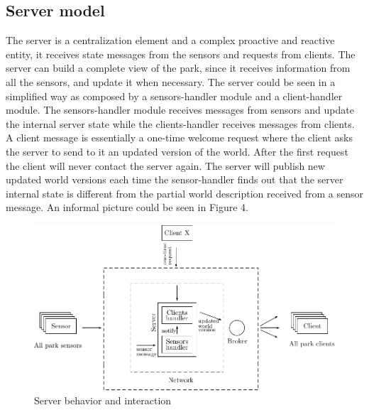 \documentclass[11pt]{article}
\begin{document}
\subsection{Server model}
The server is a centralization element and a complex proactive and reactive entity, it receives state messages from the sensors and requests from clients. The server can build a complete view of the park, since it receives information from all the sensors, and update it when necessary. The server could be seen in a simplified way as composed by a sensors-handler module and a client-handler module. The sensors-handler module receives messages from sensors and update the internal server state while the clients-handler receives messages from clients. A client message is essentially a one-time welcome request where the client asks the server to send to it an updated version of the world. After the first request the client will never contact the server again. The server will publish new updated world versions each time the sensor-handler finds out that the server internal state is different from the partial world description received from a sensor message. An informal picture could be seen in Figure 4.
\begin{figure}
  \centering
	\includegraphics[scale=1]{server}
  \caption{Server behavior and interaction}
\end{figure}
\end{document}
